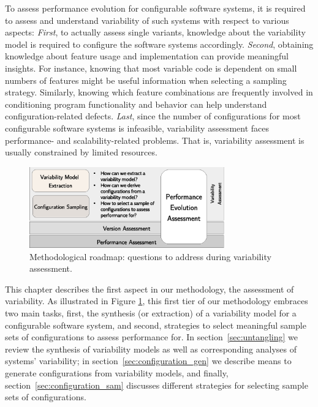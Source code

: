To assess performance evolution for configurable software systems, it is
required to assess and understand variability of such systems with respect to
various aspects: \emph{First}, to actually assess single variants, knowledge
about the variability model is required to configure the software systems accordingly.
\emph{Second}, obtaining knowledge about feature usage and implementation can
provide meaningful insights. For instance, knowing that most variable code is dependent
on small numbers of features might be useful information when selecting a
sampling strategy. Similarly, knowing which feature combinations are frequently
involved in conditioning program functionality and behavior can help understand
configuration-related defects. \emph{Last}, since the number of configurations
for most configurable software systems is infeasible, variability assessment faces
performance- and scalability-related problems. That is, variability assessment
is usually constrained by limited resources.

\begin{figure}[h!]
	\centering
	\includegraphics[width=0.75\textwidth]{images/process_varassesment.eps}
	\caption{Methodological roadmap: questions to address during variability
	assessment.}
	\label{fig:roadmap_1}
\end{figure}
 
This chapter describes the first aspect in our methodology, the assessment of
variability. As illustrated in Figure \ref{fig:roadmap_1}, this first tier of
our methodology embraces two main tasks, first, the synthesis (or extraction) of a variability model for a configurable software system, and second, strategies to select
meaningful sample sets of configurations to assess performance for. In
section~\ref{sec:untangling} we review the synthesis of variability models as
well as corresponding analyses of systems’ variability; in
section~\ref{sec:configuration_gen} we describe means to generate configurations from variability models, and finally,
section~\ref{sec:configuration_sam} discusses different strategies for selecting
sample sets of configurations.

